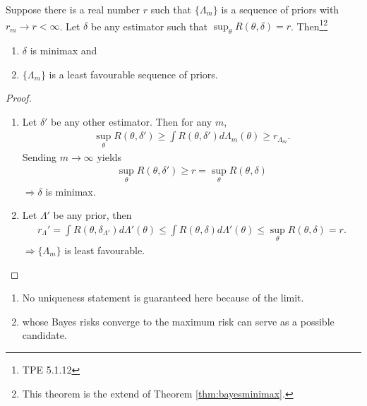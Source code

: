 \begin{theorem}
    Suppose there is a real number $r$ such that $\{\Lambda_m\}$ is a sequence of priors with $r_m\to{r}<\infty$.
    Let $\delta$ be any estimator such that $\sup_\theta{R(\theta,\delta)}=r$. 
    Then\footnote{TPE 5.1.12}\footnote{This theorem is the extend of Theorem \ref{thm:bayesminimax}.}
    \begin{enumerate}[{(i)}]
        \item $\delta$ is minimax and 
        \item $\{\Lambda_m\}$ is a least favourable sequence of priors.
    \end{enumerate}
\end{theorem}
\begin{proof}
    $~$
    \begin{enumerate}[{(i)}]
        \item Let $\delta'$ be any other estimator.
        Then for any $m$,
        \begin{gather}
            \sup_\theta R(\theta,\delta')\geq\int{R(\theta,\delta')}d\Lambda_m(\theta)\geq{r_{\Lambda_m}}.
        \end{gather}
        Sending $m\to\infty$ yields
        \begin{gather}
            \sup_\theta R(\theta,\delta')\geq{r}=\sup_\theta R(\theta,\delta)
        \end{gather}
        $\Rightarrow\delta$ is minimax.
        \item Let $\Lambda'$ be any prior, then
        \begin{gather}
            r_\Lambda'=\int{R(\theta,\delta_{\Lambda'})}d\Lambda'(\theta)
            \leq \int{R(\theta,\delta)}d\Lambda'(\theta)
            \leq \sup_\theta R(\theta,\delta)
            =r.
        \end{gather}
        $\Rightarrow\{\Lambda_m\}$ is least favourable.
    \end{enumerate}
\end{proof}

\begin{note}
    \begin{enumerate}
        \item No uniqueness statement is guaranteed here because of the limit.
        \item whose Bayes risks converge to the maximum risk can serve as a possible candidate.
    \end{enumerate}
\end{note}

